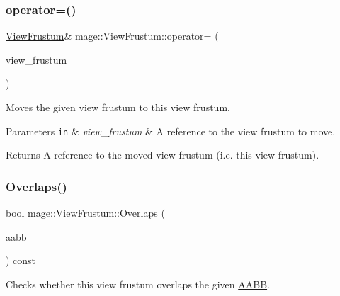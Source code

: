 \subsubsection{\texorpdfstring{operator=()}{operator=()}\hspace{0.1cm}{\footnotesize\ttfamily [2/2]}}
{\footnotesize\ttfamily \hyperlink{structmage_1_1_view_frustum}{View\+Frustum}\& mage\+::\+View\+Frustum\+::operator= (\begin{DoxyParamCaption}\item[{\hyperlink{structmage_1_1_view_frustum}{View\+Frustum} \&\&}]{view\+\_\+frustum }\end{DoxyParamCaption})\hspace{0.3cm}{\ttfamily [default]}}

Moves the given view frustum to this view frustum.


\begin{DoxyParams}[1]{Parameters}
\mbox{\tt in}  & {\em view\+\_\+frustum} & A reference to the view frustum to move. \\
\hline
\end{DoxyParams}
\begin{DoxyReturn}{Returns}
A reference to the moved view frustum (i.\+e. this view frustum). 
\end{DoxyReturn}
\hypertarget{structmage_1_1_view_frustum_a35c0afb66692cfd26a0e9bee2065892e}{}\label{structmage_1_1_view_frustum_a35c0afb66692cfd26a0e9bee2065892e} 
\subsubsection{\texorpdfstring{Overlaps()}{Overlaps()}\hspace{0.1cm}{\footnotesize\ttfamily [1/2]}}
{\footnotesize\ttfamily bool mage\+::\+View\+Frustum\+::\+Overlaps (\begin{DoxyParamCaption}\item[{const \hyperlink{structmage_1_1_a_a_b_b}{A\+A\+BB} \&}]{aabb }\end{DoxyParamCaption}) const\hspace{0.3cm}{\ttfamily [noexcept]}}

Checks whether this view frustum overlaps the given \hyperlink{structmage_1_1_a_a_b_b}{A\+A\+BB}.


